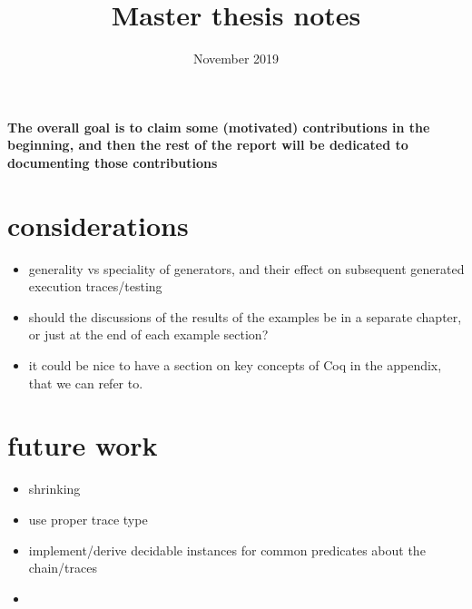 \documentclass{article}
\title{Master thesis notes}
\date{November 2019}
\begin{document}
\maketitle

\textbf{The overall goal is to claim some (motivated) contributions in the beginning, and then the rest of the report will be dedicated to documenting those contributions}


\section{considerations}
\begin{itemize}
    \item generality vs speciality of generators, and their effect on subsequent generated execution traces/testing
    \item should the discussions of the results of the examples be in a separate chapter, or just at the end of each example section?
    \item it could be nice to have a section on key concepts of Coq in the appendix, that we can refer to.
\end{itemize}

\section{future work}
\begin{itemize}
    \item shrinking
    \item use proper trace type
    \item implement/derive decidable instances for common predicates about the chain/traces
    \item 
\end{itemize}
\end{document}

